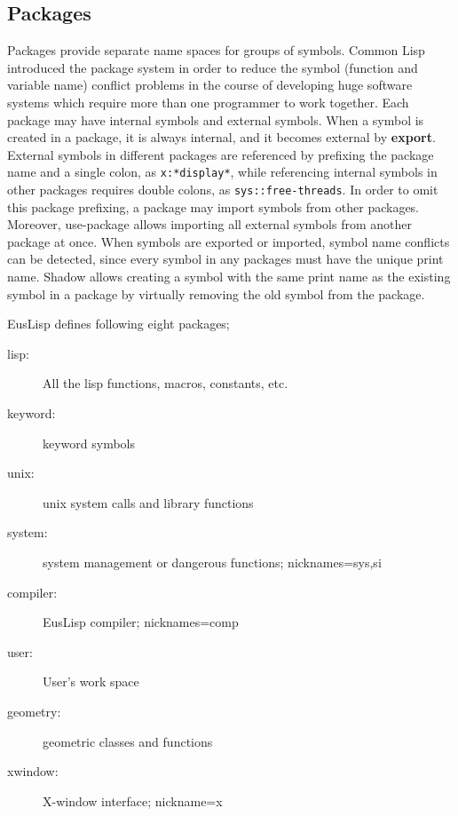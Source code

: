 \begin{refdesc}


\end{refdesc}

\subsection{Packages}

Packages provide separate name spaces for groups of symbols.
Common Lisp introduced the package system in order to reduce the
symbol (function and variable name) conflict problems 
in the course of developing huge software systems
which require more than one programmer to work together.
Each package may have internal symbols and external symbols.
When a symbol is created in a package, it is always internal,
and it becomes external by {\bf export}. External symbols in different
packages are referenced by prefixing the package name and a single colon,
as {\tt x:*display*}, while referencing internal symbols in other packages
requires double colons, as {\tt sys::free-threads}.
In order to omit this package prefixing, a package may {\bfx import} symbols
from other packages.
Moreover, {\bfx use-package} allows importing all external symbols
from another package at once.
When symbols are exported or imported, symbol name conflicts can be detected,
since every symbol in any packages must have the unique print name.
{\bfx Shadow} allows creating a symbol with the same print name as the
existing symbol in a package by virtually removing the old symbol from 
the package.

EusLisp defines following eight packages;
\begin{description}
\item [lisp:] All the lisp functions, macros, constants, etc.
\item [keyword:] keyword symbols 
\item [unix:] unix system calls and library functions
\item [system:] system management or dangerous functions; nicknames=sys,si
\item [compiler:] EusLisp compiler; nicknames=comp
\item [user:] User's work space
\item [geometry:] geometric classes and functions
\item [xwindow:] X-window interface; nickname=x
\end{description}

